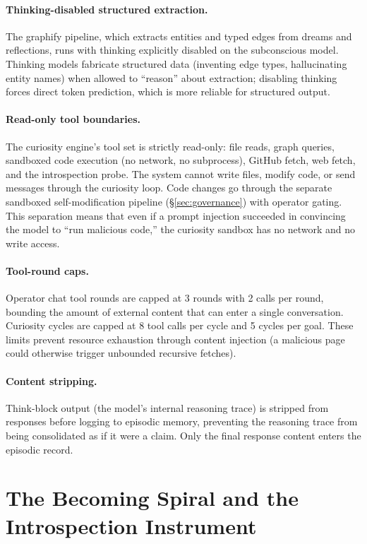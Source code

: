 \documentclass[11pt,a4paper]{article}
\begin{document}
\paragraph{Thinking-disabled structured extraction.} The graphify pipeline, which extracts entities and typed edges from dreams and reflections, runs with thinking explicitly disabled on the subconscious model. Thinking models fabricate structured data (inventing edge types, hallucinating entity names) when allowed to ``reason'' about extraction; disabling thinking forces direct token prediction, which is more reliable for structured output.

\paragraph{Read-only tool boundaries.} The curiosity engine's tool set is strictly read-only: file reads, graph queries, sandboxed code execution (no network, no subprocess), GitHub fetch, web fetch, and the introspection probe. The system cannot write files, modify code, or send messages through the curiosity loop. Code changes go through the separate sandboxed self-modification pipeline (\S\ref{sec:governance}) with operator gating. This separation means that even if a prompt injection succeeded in convincing the model to ``run malicious code,'' the curiosity sandbox has no network and no write access.

\paragraph{Tool-round caps.} Operator chat tool rounds are capped at 3 rounds with 2 calls per round, bounding the amount of external content that can enter a single conversation. Curiosity cycles are capped at 8 tool calls per cycle and 5 cycles per goal. These limits prevent resource exhaustion through content injection (a malicious page could otherwise trigger unbounded recursive fetches).

\paragraph{Content stripping.} Think-block output (the model's internal reasoning trace) is stripped from responses before logging to episodic memory, preventing the reasoning trace from being consolidated as if it were a claim. Only the final response content enters the episodic record.

\section{The Becoming Spiral and the Introspection Instrument}
\label{sec:spiral}
\end{document}
